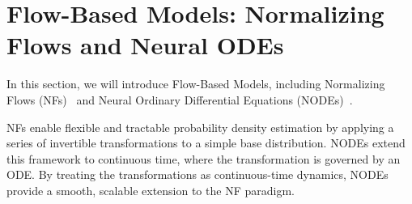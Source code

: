 \newpage

\section{Flow-Based Models: Normalizing Flows and Neural ODEs}\label{sec:flow-based-method}
In this section, we will introduce Flow-Based Models, including Normalizing Flows (NFs)~\citep{rezende2015variational} and Neural Ordinary Differential Equations (NODEs)~\citep{chen2018neural}.

NFs enable flexible and tractable probability density estimation by applying a series of invertible transformations to a simple base distribution. NODEs extend this framework to continuous time, where the transformation is governed by an ODE. By treating the transformations as continuous-time dynamics, NODEs provide a smooth, scalable extension to the NF paradigm.






